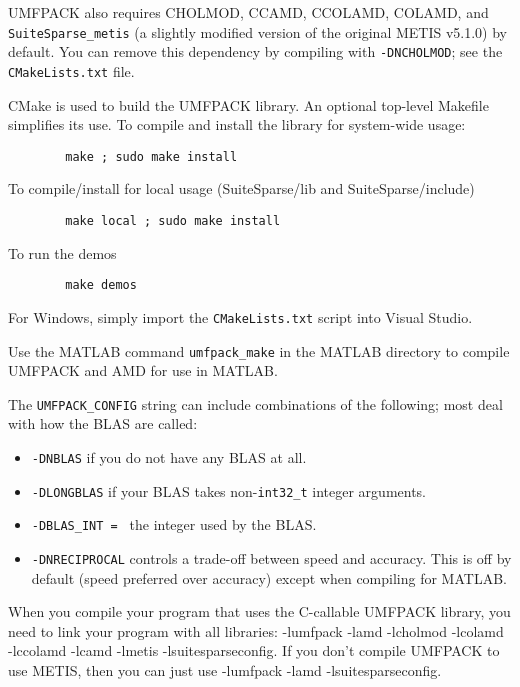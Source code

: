 \documentclass[11pt]{article}
\begin{document}
UMFPACK also requires CHOLMOD, CCAMD, CCOLAMD, COLAMD, and
\verb'SuiteSparse_metis' (a slightly modified version of the original
METIS v5.1.0) by default.  You can remove this dependency by compiling with
\verb'-DNCHOLMOD'; see the \verb'CMakeLists.txt' file.

CMake is used to build the UMFPACK library.  An optional top-level Makefile
simplifies its use.  To compile and install the library for system-wide usage:

\begin{verbatim}
        make ; sudo make install
\end{verbatim}

    To compile/install for local usage (SuiteSparse/lib and SuiteSparse/include)

\begin{verbatim}
        make local ; sudo make install
\end{verbatim}

    To run the demos

\begin{verbatim}
        make demos
\end{verbatim}

For Windows, simply import the \verb'CMakeLists.txt' script into Visual Studio.

Use the MATLAB command {\tt umfpack\_make} in the MATLAB directory
to compile UMFPACK and AMD for use in MATLAB.

The {\tt UMFPACK\_CONFIG} string can include combinations of the following;
most deal with how the BLAS are called:
\begin{itemize}
\item {\tt -DNBLAS} if you do not have any BLAS at all.
\item {\tt -DLONGBLAS} if your BLAS takes non-\verb'int32_t' integer arguments.
\item {\tt -DBLAS\_INT = } the integer used by the BLAS.

\item {\tt -DNRECIPROCAL} controls a trade-off between speed and accuracy.
    This is off by default (speed preferred over accuracy) except when
    compiling for MATLAB.
\end{itemize}

When you compile your program that uses the C-callable UMFPACK library,
you need to link your program with all libraries:
-lumfpack -lamd -lcholmod -lcolamd -lccolamd -lcamd -lmetis -lsuitesparseconfig.
If you don't compile UMFPACK to use METIS, then you can  just use
-lumfpack -lamd -lsuitesparseconfig.
\end{document}

